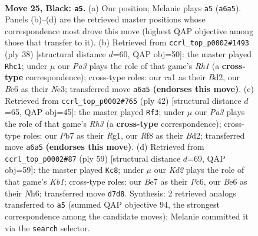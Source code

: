 \documentclass[11pt]{article}
\begin{document}
\clearpage

\begin{figure}[p]\centering
\begin{subfigure}{0.46\textwidth}\centering
\resizebox{\linewidth}{!}{%
\newchessgame
\chessboard[
  setfen={rn3r2/1p1kb1pp/p3b3/3pPp1P/8/P5P1/4N1K1/RNB2R2 b - - 3 25},
  showmover=false,
  pgfstyle=straightmove, color=movearrow, markmove={a6-a5}
]}
\caption{}
\end{subfigure}\hfill
\begin{subfigure}{0.46\textwidth}\centering
\resizebox{\linewidth}{!}{%
\newchessgame
\chessboard[
  setfen={r6r/1pp2kp1/3b1n2/7p/P2PpP1P/2N3P1/1P1BK3/R6R w - - 1 20},
  showmover=false,
  pgfstyle=straightmove, color=movearrow, markmove={h1-c1}
]}
\caption{}
\end{subfigure}
\\[4pt]
\begin{subfigure}{0.46\textwidth}\centering
\resizebox{\linewidth}{!}{%
\newchessgame
\chessboard[
  setfen={2r3k1/p2rb1pp/1np1pp2/7P/6P1/2NP3R/PP1BKP2/6R1 w - - 7 22},
  showmover=false,
  pgfstyle=straightmove, color=movearrow, markmove={h3-f3}
]}
\caption{}
\end{subfigure}\hfill
\begin{subfigure}{0.46\textwidth}\centering
\resizebox{\linewidth}{!}{%
\newchessgame
\chessboard[
  setfen={1k2rr2/2p5/p1p4n/1p2Ppb1/7p/7P/PPP3PB/3NRR1K b - - 1 30},
  showmover=false,
  pgfstyle=straightmove, color=movearrow, markmove={b8-c8}
]}
\caption{}
\end{subfigure}
\caption{\textbf{Move 25, Black: \texttt{a5}.} (a) Our position; Melanie plays \texttt{a5} (\texttt{a6a5}). Panels (b)--(d) are the retrieved master positions whose correspondence most drove this move (highest QAP objective among those that transfer to it). (b) Retrieved from \texttt{ccrl\_top\_p0002\#1493} (ply 38) [structural distance $d$=60, QAP obj=50]: the master played \texttt{Rhc1}; under $\mu$ our \emph{Pa3} plays the role of that game's \emph{Rh1} (a \textbf{cross-type} correspondence); cross-type roles: our \emph{r}a1 as their \emph{B}d2, our \emph{B}e6 as their \emph{N}c3; transferred move \texttt{a6a5} \textbf{(endorses this move)}. (c) Retrieved from \texttt{ccrl\_top\_p0002\#765} (ply 42) [structural distance $d$=65, QAP obj=45]: the master played \texttt{Rf3}; under $\mu$ our \emph{Pa3} plays the role of that game's \emph{Rh3} (a \textbf{cross-type} correspondence); cross-type roles: our \emph{P}b7 as their \emph{R}g1, our \emph{R}f8 as their \emph{B}d2; transferred move \texttt{a6a5} \textbf{(endorses this move)}. (d) Retrieved from \texttt{ccrl\_top\_p0002\#87} (ply 59) [structural distance $d$=69, QAP obj=59]: the master played \texttt{Kc8}; under $\mu$ our \emph{Kd2} plays the role of that game's \emph{Kb1}; cross-type roles: our \emph{B}e7 as their \emph{P}c6, our \emph{B}e6 as their \emph{N}h6; transferred move \texttt{d7d8}. Synthesis: 2 retrieved analogs transferred to \texttt{a5} (summed QAP objective 94, the strongest correspondence among the candidate moves); Melanie committed it via the \texttt{search} selector.}
\label{fig:thought-m49}
\end{figure}
\end{document}
